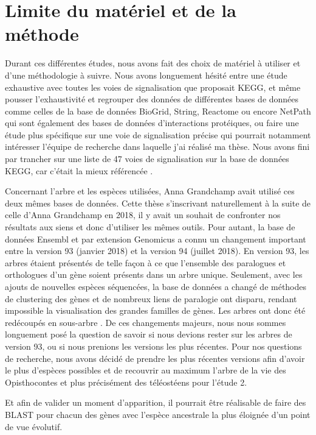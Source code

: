 \section{Limite du matériel et de la méthode}
\par Durant ces différentes études, nous avons fait des choix de matériel à utiliser et d’une méthodologie à suivre. Nous avons longuement hésité entre une étude exhaustive avec toutes les voies de signalisation que proposait KEGG, et même pousser l’exhaustivité et regrouper des données de différentes bases de données comme celles de la base de données BioGrid, String, Reactome ou encore NetPath qui sont également des bases de données d’interactions protéiques, ou faire une étude plus spécifique sur une voie de signalisation précise qui pourrait notamment intéresser l’équipe de recherche dans laquelle j’ai réalisé ma thèse. Nous avons fini par trancher sur une liste de 47 voies de signalisation sur la base de données KEGG, car c’était la mieux référencée \parencite{rigden_26th_2019}. 
\par Concernant l’arbre et les espèces utilisées, Anna Grandchamp avait utilisé ces deux mêmes bases de données. Cette thèse s’inscrivant naturellement à la suite de celle d’Anna Grandchamp en 2018, il y avait un souhait de confronter nos résultats aux siens et donc d’utiliser les mêmes outils. Pour autant, la base de données Ensembl et par extension Genomicus a connu un changement important entre la version 93 (janvier 2018) et la version 94 (juillet 2018). En version 93, les arbres étaient présentés de telle façon à ce que l’ensemble des paralogues et orthologues d’un gène soient présents dans un arbre unique. Seulement, avec les ajouts de nouvelles espèces séquencées, la base de données a changé de méthodes de clustering des gènes et de nombreux liens de paralogie ont disparu, rendant impossible la visualisation des grandes familles de gènes. Les arbres ont donc été redécoupés en sous-arbre \parencite{emily_changes_2018}. De ces changements majeurs, nous nous sommes longuement posé la question de savoir si nous devions rester sur les arbres de version 93, ou si nous prenions les versions les plus récentes. Pour nos questions de recherche, nous avons décidé de prendre les plus récentes versions afin d’avoir le plus d’espèces possibles et de recouvrir au maximum l’arbre de la vie des Opisthocontes et plus précisément des téléostéens pour l’étude 2. 
\par Et afin de valider un moment d’apparition, il pourrait être réalisable de faire des BLAST pour chacun des gènes avec l’espèce ancestrale la plus éloignée d’un point de vue évolutif. 
